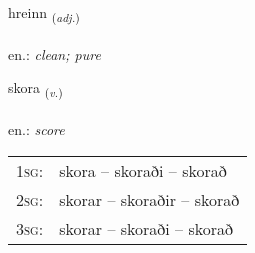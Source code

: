 \documentclass[frontgrid, backgrid]{flacards}\usepackage[]{graphicx}\usepackage[]{xcolor}
\begin{document}
\renewcommand{\flhead}{\vskip5pt \fboxsep=0pt {\small\bfseries\footnotesize Lýsingarorð | Adjective}}
\renewcommand{\fcfoot}{\vskip5pt \fboxsep=0pt \hspace{2pt}{\small\bfseries\footnotesize 1K}}

\renewcommand{\blhead}{\vskip5pt {\small\bfseries\footnotesize Lýsingarorð | Adjective }}
\renewcommand{\bcfoot}{\vskip5pt \hspace{2pt}{\small\bfseries\footnotesize 1K}}


{hreinn \small{\textsubscript{(\textit{adj.})}} \\[1ex] %
\textphonetic{[r̥eitn̥]} \\
en.: \emph{clean; pure} \\  [2ex]
\renewcommand*{\arraystretch}{0.8}
}

\renewcommand{\flhead}{\vskip5pt \fboxsep=0pt {\small\bfseries\footnotesize Sagnorð | Verb}}
\renewcommand{\fcfoot}{\vskip5pt \fboxsep=0pt \hspace{2pt}{\small\bfseries\footnotesize 1K}}

\renewcommand{\blhead}{\vskip5pt {\small\bfseries\footnotesize Sagnorð | Verb }}
\renewcommand{\bcfoot}{\vskip5pt \hspace{2pt}{\small\bfseries\footnotesize 1K}}


{skora \small{\textsubscript{(\textit{v.})}} \\[1ex] %
\textphonetic{[skɔːra]} \\
en.: \emph{score} \\  [2ex]
\renewcommand*{\arraystretch}{0.8}
\begin{tabular}{p{1cm}l}
\textsc{1sg}: & skora -- skoraði -- skorað \\ 
\textsc{2sg}: & skorar -- skoraðir -- skorað \\ 
\textsc{3sg}: & skorar -- skoraði -- skorað \\ 
\end{tabular}
}
\end{document}
